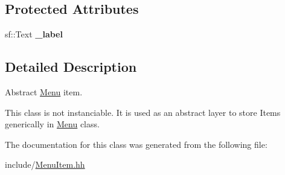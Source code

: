 \subsection*{Protected Attributes}
\begin{DoxyCompactItemize}
\item 
sf\+::\+Text {\bfseries \+\_\+label}\hypertarget{classMenuItem_ab0215e2c749d101cc1f3bda0801228c5}{}\label{classMenuItem_ab0215e2c749d101cc1f3bda0801228c5}

\end{DoxyCompactItemize}


\subsection{Detailed Description}
Abstract \hyperlink{classMenu}{Menu} item. 

This class is not instanciable. It is used as an abstract layer to store Items generically in \hyperlink{classMenu}{Menu} class. 

The documentation for this class was generated from the following file\+:\begin{DoxyCompactItemize}
\item 
include/\hyperlink{MenuItem_8hh}{Menu\+Item.\+hh}\end{DoxyCompactItemize}
